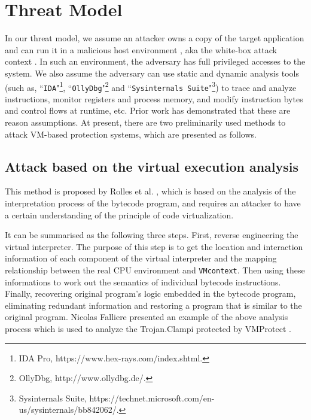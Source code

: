\section{Threat Model}\label{sec:threat-model}
In our threat model, we assume an attacker owns a copy of the target application and can run it in a malicious host environment \cite{collberg2002watermarking}, aka the white-box attack context \cite{chow2003white,liem2008compiler}. 
In such an environment, the adversary has full privileged accesses to the system. We also assume the adversary can use static and dynamic analysis tools (such as, ``\texttt{IDA}"\footnote{IDA Pro, https://www.hex-rays.com/index.shtml.}, ``\texttt{OllyDbg}"\footnote{OllyDbg, http://www.ollydbg.de/.} and ``\texttt{Sysinternals Suite}"\footnote{Sysinternals Suite, https://technet.microsoft.com/en-us/sysinternals/bb842062/.}) to trace and analyze instructions, monitor registers and process memory, and modify instruction bytes and control flows at runtime, etc.
Prior work has demonstrated that these are reason assumptions.
At present, there are two preliminarily used methods to attack VM-based protection systems, which are presented as follows. 

\subsection{Attack based on the virtual execution analysis}
This method is proposed by Rolles et al. \cite{rolles2009unpacking}, which is based on the analysis of the interpretation process of the bytecode program, and requires an attacker to have a certain understanding of the principle of code virtualization.

It can be summarised as the following three steps. First, reverse engineering the virtual interpreter. The purpose of this step is to get the location and interaction information of each component of the virtual interpreter and the mapping relationship between the real CPU environment and \texttt{VMcontext}. Then using these informations to work out the semantics of individual bytecode instructions. %
Finally, recovering original program's logic embedded in the bytecode program, eliminating redundant information and restoring a program that is similar to the original program. Nicolas Falliere \cite{falliere2009inside} presented an example of the above analysis process which is used to analyze the Trojan.Clampi protected by VMProtect \cite{vmp}.

